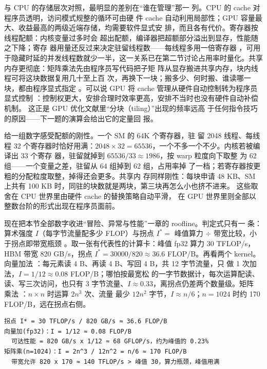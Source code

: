 与 CPU 的存储层次对照，最明显的差别在“谁在管理”那一
列。CPU 的 cache 对程序员透明，访问模式规整的循环可由硬
件 cache 自动利用局部性；GPU 容量最大、收益最高的两级近端存储，均需要软件显式安
排，而且各有代价。寄存器按线程配额：内核变量过多时会
超出配额，编译器把超额部分溢出到显存，性能随之下降；寄存
器用量还反过来决定驻留线程数——每线程多用一倍寄存器
，可用于隐藏时延的并发线程数就少一半，这一关系已在第二节讨论占用率时量化。共享内存更彻底：矩阵乘法先由程序员写代码把子矩
阵从显存搬进共享内存，块内线程可将这块数据复用几十至上百
次，再换下一块；搬多少、何时搬、谁读哪一块，都由程序显式指定
。可以说 GPU 将 cache 管理从硬件自动控制转为程序员显式控制
：控制权更大，安排合理时效率更高，安排不当时也没有硬件自动补偿机制。
这正是 GPU 优化文献里“分块（tiling）”出现的频率远高
于任何指令技巧的原因——下一题的演算会给出它的定量回
报。

给一组数字感受配额的刚性。一个 SM 的 64K 个寄存器，驻
留 2048 线程、每线程 32 个寄存器时恰好用满：$2048\times
32=65536$，一个不多一个不少。内核若被编译出 33 个寄存
器，驻留就掉到 $65536/33\approx1986$，按 warp 粒度向下取整
为 62 组——一个变量之差，驻留从 64 组掉到 62 组，占用率掉
了一档；若寄存器按更粗的分配粒度取整，掉得还会更多。共享内
存同样刚性：每块申请 48 KB、SM 上共有 100
KB 时，同驻的块数就是两块，第三块再怎么小也挤不进来。
这些取舍在 CPU 世界里由硬件 cache 的替换策略自动平滑，
在 GPU 世界里则全部以整数台阶的形式出现在程序员面前。

现在把本节全部数字收进“冒险、异常与性能”一章的 roofline。判定式只有一
条：算术强度 $I$（每字节流量配多少 FLOP）与拐点
$I^{*}=$ 峰值算力 $\div$ 带宽比较，小于拐点即带宽瓶颈
。取一张有代表性的计算卡：峰值 fp32 算力 30 TFLOP/s，
HBM 带宽 820 GB/s，拐点 $I^{*}=30000/820\approx36.6$
FLOP/B。再看两个 kernel。向量加法 
：每元素读 4 B、再读 4 B、写回 4 B，共 12 字节流量，只
做 1 次加法，$I=1/12\approx0.08$ FLOP/B；哪怕按最宽松
的一字节数据计，每次运算配读、读、写三次访问，也只有
3 字节流量、$I\approx0.33$，离拐点仍差两个数量级。矩阵
乘法 ：$n\times n$ 时运算 $2n^{3}$ 次、流量
最少 $12n^{2}$ 字节，$I\approx n/6$；$n=1024$ 时约
170 FLOP/B，远在拐点右侧。

\begin{lstlisting}
拐点 I* = 30 TFLOP/s / 820 GB/s ≈ 36.6 FLOP/B
向量加(fp32)：I = 1/12 ≈ 0.08 FLOP/B
  可达性能 = 820 GB/s x 1/12 ≈ 68 GFLOP/s，约为峰值的 0.23%
矩阵乘(n=1024)：I = 2n^3 / 12n^2 = n/6 ≈ 170 FLOP/B
  带宽允许 820 x 170 ≈ 140 TFLOP/s > 峰值 30，算力瓶颈，峰值用满
\end{lstlisting}


